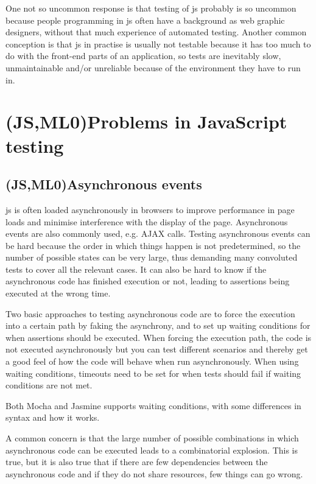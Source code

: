 \documentclass[11pt]{article}
\begin{document}
One not so uncommon response is that testing of \gls{js} probably is so uncommon because people programming in \gls{js} often have a background as web graphic designers, without that much experience of automated testing. Another common conception is that \gls{js} in practise is usually not testable because it has too much to do with the front-end parts of an application, so tests are inevitably slow, unmaintainable and/or unreliable because of the environment they have to run in.


\section{(JS,ML0)Problems in JavaScript testing}

\subsection{(JS,ML0)Asynchronous events}

\gls{js} is often loaded asynchronously in browsers to improve performance in page loads and minimise interference with the display of the page. Asynchronous events are also commonly used, e.g. AJAX calls. Testing asynchronous events can be hard because the order in which things happen is not predetermined, so the number of possible states can be very large, thus demanding many convoluted tests to cover all the relevant cases. It can also be hard to know if the asynchronous code has finished execution or not, leading to assertions being executed at the wrong time.

Two basic approaches to testing asynchronous code are to force the execution into a certain path by faking the asynchrony, and to set up waiting conditions for when assertions should be executed. When forcing the execution path, the code is not executed asynchronously but you can test different scenarios and thereby get a good feel of how the code will behave when run asynchronously. When using waiting conditions, timeouts need to be set for when tests should fail if waiting conditions are not met.

Both Mocha and Jasmine supports waiting conditions, with some differences in syntax and how it works.

A common concern is that the large number of possible combinations in which asynchronous code can be executed leads to a combinatorial explosion. This is true, but it is also true that if there are few dependencies between the asynchronous code and if they do not share resources, few things can go wrong.
\end{document}
